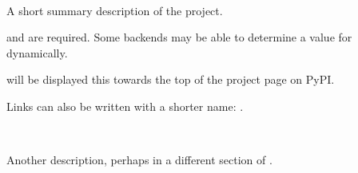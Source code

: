 \documentclass[letterpaper,10pt,english]{sphinxmanual}
\begin{document}

\begin{fulllineitems}
\label{\detokenize{index:tconf-description}}~
\vspace{-45px}

\begin{DUlineblock}{0em}
\item[]  
\item[]  
\item[]  
\end{DUlineblock}

\vspace{-25px}

A short summary description of the project.

\end{fulllineitems}


{\hyperref[\detokenize{index:tconf-project.name}]{}} and {\hyperref[\detokenize{index:tconf-project.version}]{}} are required.
Some backends may be able to determine a value for  dynamically.

{\hyperref[\detokenize{index:tconf-description}]{}} will be displayed this towards the top of the project page on PyPI.

Links can also be written with a shorter name: {\hyperref[\detokenize{index:tconf-project.name}]{}}.


\begin{fulllineitems}
~
\vspace{-45px}

\begin{DUlineblock}{0em}
\item[]  
\item[]  
\item[]  
\end{DUlineblock}

\vspace{-25px}

Another description, perhaps in a different section of .

\end{fulllineitems}
\end{document}
